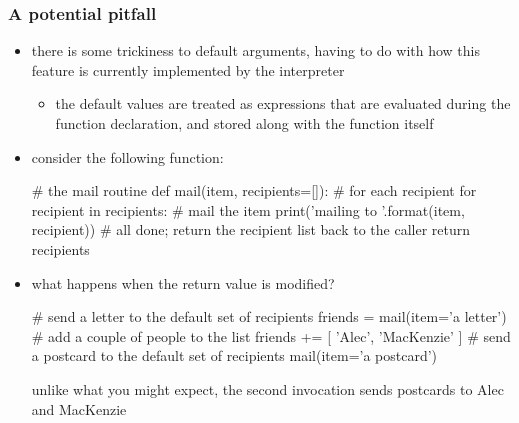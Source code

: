 \begin{frame}[fragile]
%
  \frametitle{A potential pitfall}
%
  \begin{itemize}
%
  \item there is some trickiness to default arguments, having to do with how this feature is
    currently implemented by the interpreter
    \begin{itemize}
    \item the default values are treated as expressions that are evaluated during the
        function declaration, and stored along with the function itself
    \end{itemize}
%
  \item consider the following function:
    \begin{ipython}{}
      # the mail routine
      def mail(item, recipients=[]):
          # for each recipient
          for recipient in recipients:
              # mail the item
              print('mailing {} to {}'.format(item, recipient))
          # all done; return the recipient list back to the caller
          return recipients
    \end{ipython}
%
  \item what happens when the return value is modified?
    \begin{ipython}{}
      # send a letter to the default set of recipients
      friends = mail(item='a letter')
      # add a couple of people to the list
      friends += [ 'Alec', 'MacKenzie' ]
      # send a postcard to the default set of recipients
      mail(item='a postcard')
    \end{ipython}
    unlike what you might expect, the second invocation sends postcards to Alec and MacKenzie
%
  \end{itemize}
%
\end{frame}


